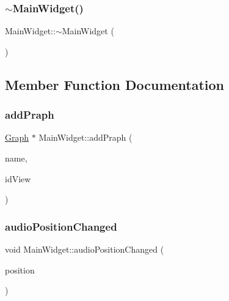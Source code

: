 \hypertarget{class_main_widget_add21c63f8e799303a21a69da3d288c2f}{}\label{class_main_widget_add21c63f8e799303a21a69da3d288c2f} 
\subsubsection{\texorpdfstring{$\sim$\+Main\+Widget()}{~MainWidget()}}
{\footnotesize\ttfamily Main\+Widget\+::$\sim$\+Main\+Widget (\begin{DoxyParamCaption}{ }\end{DoxyParamCaption})}



\subsection{Member Function Documentation}
\hypertarget{class_main_widget_add0a22a4b6838c7a07e48cf6a9f4ecb3}{}\label{class_main_widget_add0a22a4b6838c7a07e48cf6a9f4ecb3} 
\subsubsection{\texorpdfstring{add\+Praph}{addPraph}}
{\footnotesize\ttfamily \hyperlink{class_graph}{Graph} $\ast$ Main\+Widget\+::add\+Praph (\begin{DoxyParamCaption}\item[{Q\+String}]{name,  }\item[{int}]{id\+View }\end{DoxyParamCaption})\hspace{0.3cm}{\ttfamily [slot]}}

\hypertarget{class_main_widget_ad3f4f2ec0b4354b72e6626eac21abc52}{}\label{class_main_widget_ad3f4f2ec0b4354b72e6626eac21abc52} 
\subsubsection{\texorpdfstring{audio\+Position\+Changed}{audioPositionChanged}}
{\footnotesize\ttfamily void Main\+Widget\+::audio\+Position\+Changed (\begin{DoxyParamCaption}\item[{qint64}]{position }\end{DoxyParamCaption})\hspace{0.3cm}{\ttfamily [slot]}}

